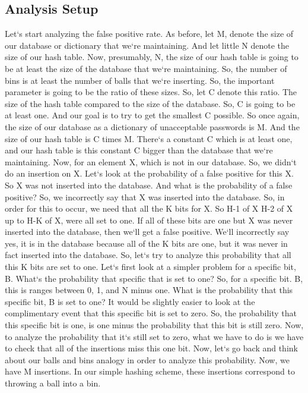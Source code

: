 \subsection{Analysis Setup}
Let`s start analyzing the false positive rate.
As before, let M, denote the size of our database or dictionary that we`re maintaining.
And let little N denote the size of our hash table.
Now, presumably, N, the size of our hash table is going to be at least the size of the database that we`re maintaining.
So, the number of bins is at least the number of balls that we`re inserting.
So, the important parameter is going to be the ratio of these sizes.
So, let C denote this ratio.
The size of the hash table compared to the size of the database.
So, C is going to be at least one.
And our goal is to try to get the smallest C possible.
So once again, the size of our database as a dictionary of unacceptable passwords is M\@.
And the size of our hash table is C times M\@.
There`s a constant C which is at least one, and our hash table is this constant C bigger than the database that we`re maintaining.
Now, for an element X, which is not in our database.
So, we didn`t do an insertion on X\@.
Let`s look at the probability of a false positive for this X\@.
So X was not inserted into the database.
And what is the probability of a false positive? So, we incorrectly say that X was inserted into the database.
So, in order for this to occur, we need that all the K bits for X\@.
So H-1 of X H-2 of X up to H-K of X, were all set to one.
If all of these bits are one but X was never inserted into the database, then we`ll get a false positive.
We`ll incorrectly say yes, it is in the database because all of the K bits are one, but it was never in fact inserted into the database.
So, let`s try to analyze this probability that all this K bits are set to one.
Let`s first look at a simpler problem for a specific bit, B\@.
What`s the probability that specific that is set to one? So, for a specific bit.
B, this is ranges between 0, 1, and N minus one.
What is the probability that this specific bit, B is set to one? It would be slightly easier to look at the complimentary event that this specific bit is set to zero.
So, the probability that this specific bit is one, is one minus the probability that this bit is still zero.
Now, to analyze the probability that it`s still set to zero, what we have to do is we have to check that all of the insertions miss this one bit.
Now, let`s go back and think about our balls and bins analogy in order to analyze this probability.
Now, we have M insertions.
In our simple hashing scheme, these insertions correspond to throwing a ball into a bin.
